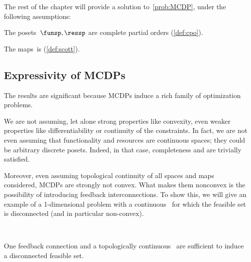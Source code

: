 
The rest of the chapter will provide a solution to~\cref{prob:MCDP},
under the following assumptions:

\begin{compactenum}
    \item The posets~$\funsp,\ressp$ are complete partial orders (\cref{def:cpo}).
    \item The maps~\ftor is \scottcontinuous (\cref{def:scott}).
\end{compactenum}

\subsection{Expressivity of MCDPs}
The results are significant because MCDPs induce a rich family of
optimization problems.

We are not assuming, let alone strong properties like convexity, even
weaker properties like differentiability or continuity of the constraints.
In fact, we are not even assuming that functionality and resources
are continuous spaces; they could be arbitrary discrete posets.
Indeed, in that case, completeness and \scottcontinuity are trivially satisfied.


Moreover, even assuming topological continuity of all spaces and maps
considered, MCDPs are strongly not convex. What makes them nonconvex
is the possibility of introducing feedback interconnections. To show
this, we will give an example of a 1-dimensional problem with a continuous~\ftor
for which the feasible set is disconnected (and in particular non-convex).

\begin{marginfigure}
    \centering
    \\
    \caption{One feedback connection and a topologically continuous~\ftor
    are sufficient to induce a disconnected feasible set.}
    \label{fig:ceil-1}
\end{marginfigure}


